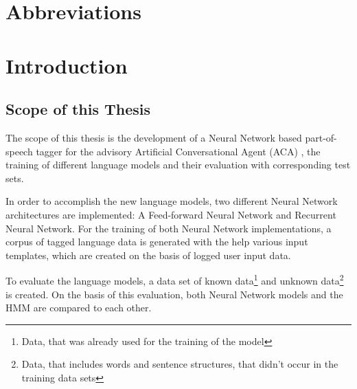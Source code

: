 \listoftables

\chapter*{Abbreviations}\label{s.abbr}
\begin{acronym}[----------------]
\end{acronym}

\chapter{Introduction}\label{c.introduction}

\section{Scope of this Thesis}\label{c.introduction.scope}
The scope of this thesis is the development of a Neural Network based part-of-speech tagger for the advisory Artificial Conversational Agent (ACA) \Alex, the training of different language models and their evaluation with corresponding test sets.

In order to accomplish the new language models, two different Neural Network architectures are implemented: A Feed-forward Neural Network and Recurrent Neural Network. For the training of both Neural Network implementations, a corpus of tagged language data is generated with the help various input templates, which are created on the basis of logged user input data.

To evaluate the language models, a data set of known data\footnote{Data, that was already used for the training of the model} and unknown data\footnote{Data, that includes words and sentence structures, that didn't occur in the training data sets} is created. On the basis of this evaluation, both Neural Network models and the HMM are compared to each other.

